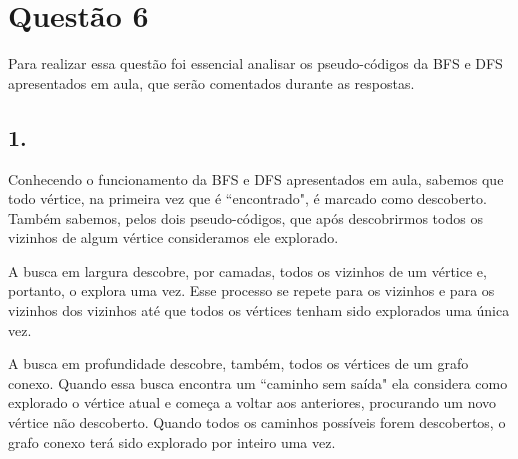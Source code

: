 \documentclass[a4paper,openright, 12pt]{article}
\begin{document}

\section*{Questão 6}
Para realizar essa questão foi essencial analisar os pseudo-códigos da BFS e DFS apresentados em aula, que serão comentados durante as respostas.
    

\subsection*{1.}
Conhecendo o funcionamento da BFS e DFS apresentados em aula, sabemos que todo vértice, na primeira vez que é ``encontrado", é marcado como descoberto. Também sabemos, pelos dois pseudo-códigos, que após descobrirmos todos os vizinhos  de algum vértice consideramos ele explorado. \par 
A busca em largura descobre, por camadas, todos os vizinhos de um vértice e, portanto, o explora uma vez. Esse processo se repete para os vizinhos e para os vizinhos dos vizinhos até que todos os vértices tenham sido explorados uma única vez. \par
A busca em profundidade descobre, também, todos os vértices de um grafo conexo. Quando essa busca encontra um ``caminho sem saída"  ela considera como explorado o vértice atual e começa a voltar aos anteriores, procurando um novo vértice não descoberto. Quando todos os caminhos possíveis forem descobertos, o grafo conexo terá sido explorado por inteiro uma vez.
\end{document}
